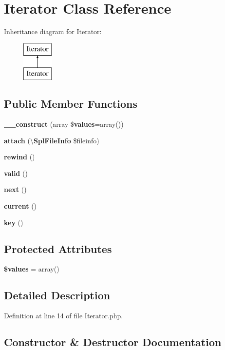 \section{Iterator Class Reference}
\label{class_symfony_1_1_component_1_1_finder_1_1_tests_1_1_iterator_1_1_iterator}
Inheritance diagram for Iterator\+:\begin{figure}[H]
\begin{center}
\leavevmode
\includegraphics[height=2.000000cm]{class_symfony_1_1_component_1_1_finder_1_1_tests_1_1_iterator_1_1_iterator}
\end{center}
\end{figure}
\subsection*{Public Member Functions}
\begin{DoxyCompactItemize}
\item 
{\bf \+\_\+\+\_\+construct} (array \${\bf values}=array())
\item 
{\bf attach} (\textbackslash{}{\bf Spl\+File\+Info} \$fileinfo)
\item 
{\bf rewind} ()
\item 
{\bf valid} ()
\item 
{\bf next} ()
\item 
{\bf current} ()
\item 
{\bf key} ()
\end{DoxyCompactItemize}
\subsection*{Protected Attributes}
\begin{DoxyCompactItemize}
\item 
{\bf \$values} = array()
\end{DoxyCompactItemize}


\subsection{Detailed Description}


Definition at line 14 of file Iterator.\+php.



\subsection{Constructor \& Destructor Documentation}
